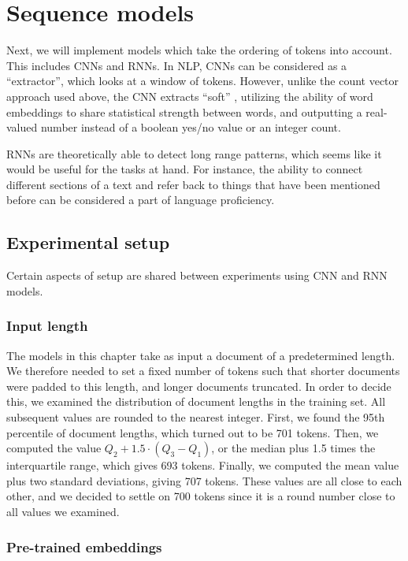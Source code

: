 \chapter{Sequence models}

Next, we will implement models which take the ordering of tokens into
account. This includes \acp{CNN} and \acp{RNN}. In \ac{NLP}, \acp{CNN} can be
considered as a ``\ngram extractor'', which looks at a window of tokens.
However, unlike the count vector approach used above, the CNN extracts
``soft'' \ngrams, utilizing the ability of word embeddings to share
statistical strength between words, and outputting a real-valued number
instead of a boolean yes/no value or an integer count.

\acp{RNN} are theoretically able to detect long range patterns, which seems
like it would be useful for the tasks at hand. For instance, the ability to
connect different sections of a text and refer back to things that have been
mentioned before can be considered a part of language proficiency.


\section{Experimental setup}

Certain aspects of setup are shared between experiments using \ac{CNN} and
\ac{RNN} models.

\subsection{Input length}

The models in this chapter take as input a document of a predetermined
length. We therefore needed to set a fixed number of tokens such that shorter
documents were padded to this length, and longer documents truncated. In
order to decide this, we examined the distribution of document lengths in the
training set. All subsequent values are rounded to the nearest integer.
First, we found the 95th percentile of document lengths, which turned out to
be 701 tokens. Then, we computed the value $Q_2 + 1.5 \cdot (Q_3 - Q_1)$, or
the median plus 1.5 times the interquartile range, which gives 693 tokens.
Finally, we computed the mean value plus two standard deviations, giving 707
tokens. These values are all close to each other, and we decided to settle on
700 tokens since it is a round number close to all values we examined.


\subsection{Pre-trained embeddings}

